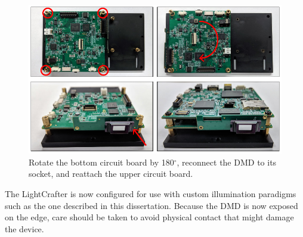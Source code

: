 \begin{figure}
    \includegraphics{figures/appendix_b/dmd_mod_6.pdf}
    \caption {
        \label{fig:dmd_mod_6}
        Rotate the bottom circuit board by 180$^\circ$, reconnect the DMD to its socket, and reattach the upper circuit board.
    }
\end{figure}

The LightCrafter is now configured for use with custom illumination paradigms such as the one described in this dissertation. Because the DMD is now exposed on the edge, care should be taken to avoid physical contact that might damage the device.



